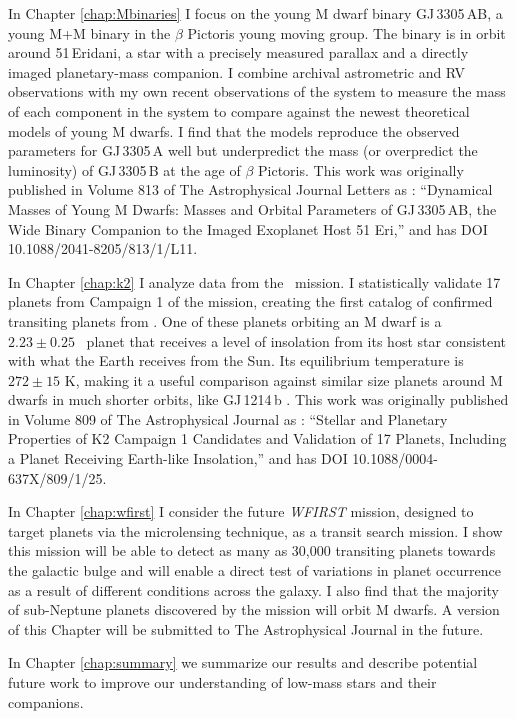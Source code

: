 In Chapter \ref{chap:Mbinaries} I focus on the young M dwarf binary 
GJ\,3305\,AB, a young M+M binary in the $\beta$ Pictoris young moving group.
The binary is in orbit around 51\,Eridani, a star with a precisely measured parallax and
a directly imaged planetary-mass companion.
I combine archival astrometric and RV observations with my own recent observations of the
system to measure the mass of each component in the system to compare against the newest
theoretical models of young M dwarfs. 
I find that the models reproduce the observed parameters for GJ\,3305\,A well but 
underpredict the mass (or overpredict the luminosity) of GJ\,3305\,B at the age of $\beta$ Pictoris.
This work was originally published in Volume 813 of The Astrophysical Journal Letters
as \citet{Montet15c}: ``Dynamical Masses of Young M Dwarfs: Masses and Orbital Parameters of GJ\,3305\,AB, the Wide Binary Companion to the Imaged Exoplanet Host 51 Eri,''
and has DOI 10.1088/2041-8205/813/1/L11.

In Chapter \ref{chap:k2} I analyze data from the \KT\ mission.
I statistically validate 17 planets from Campaign 1 of the mission, creating the first
catalog of confirmed transiting planets from \KT.
One of these planets orbiting an M dwarf is a $2.23 \pm 0.25$ \rearth\ planet that receives
a level of insolation from its host star consistent with what the Earth receives from the
Sun. 
Its equilibrium temperature is $272 \pm 15$ K, making it a useful comparison 
against similar size planets around M dwarfs in much shorter orbits, like GJ\,1214\,b
\citep{Charbonneau09}.
This work was originally published in Volume 809 of The Astrophysical Journal
as \citet{Montet15b}: ``Stellar and Planetary Properties of K2 Campaign 1 Candidates and Validation of 17 Planets, Including a Planet Receiving Earth-like Insolation,'' and has DOI 10.1088/0004-637X/809/1/25.

In Chapter \ref{chap:wfirst} I consider the future \textit{WFIRST} mission, designed to target planets via the microlensing technique, as a transit search mission. I show
this mission will be able to detect as many as 30,000 transiting planets towards the
galactic bulge and will enable a direct test of variations in planet occurrence 
as a result of different conditions across the galaxy. 
I also find that the majority of
sub-Neptune planets discovered by the mission will orbit M dwarfs. 
A version of this Chapter will be submitted
to The Astrophysical Journal in the future.

In Chapter \ref{chap:summary} we summarize our results and describe potential
future work to improve our understanding of low-mass stars and their companions. 
